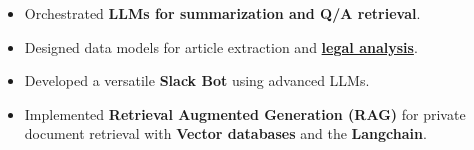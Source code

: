 \documentclass[10pt,a4paper,ragged2e,withhyper]{altacv}
\begin{document}
\begin{paracol}{2}










\begin{itemize}
    \item Orchestrated \textbf{LLMs for summarization and Q/A retrieval}.
    \item Designed data models for article extraction and \href{https://github.com/madhav-MKNC/lawrence-lab/}{\textbf{legal analysis}}.
\end{itemize}

\divider\smallskip

\begin{itemize}
    \item Developed a versatile \textbf{Slack Bot} using advanced LLMs.
    \item Implemented \textbf{Retrieval Augmented Generation (RAG)} for private document retrieval with \textbf{Vector databases} and the \textbf{Langchain}.
\end{itemize}


\end{paracol}
\end{document}
